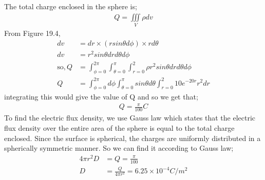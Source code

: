 \begin{exmp}
	The total charge enclosed in the sphere is;
	\begin{align*}
			Q=\iiint\limits_V\rho dv
		\end{align*}
	From Figure 19.4, 
	\begin{align*}
			dv &= dr\times(rsin\theta d\phi)\times rd\theta \\
			dv&=r^{2}sin\theta drd\theta d\phi\\
			\text{so}, Q&=\int^{2\pi}_{\phi=0}\int^{\pi}_{\theta=0}\int^{2}_{r=0} \rho r^{2}sin\theta drd\theta d\phi\\
			Q&= \int^{2\pi}_{\phi=0}d\phi\int^{\pi}_{\theta=0}sin\theta d\theta\int^{2}_{r=0}10e^{-20r}r^{2}dr
		\end{align*}
	integrating this would give the value of Q and so we get that;
	\begin{align*}
			Q=\frac{\pi}{100} C
		\end{align*}
	To find the electric flux density, we use Gauss law which states that the electric flux density over the entire area of the sphere is equal to the total charge enclosed. Since the surface is spherical, the charges are uniformly distributed in a spherically symmetric manner. So we can find it according to Gauss law;
	\begin{align*}
			4\pi r^{2}D&=Q=\frac{\pi}{100}\\
			D&=\frac{Q}{4\pi r^{2}}= 6.25\times10^{-4} C/m^{2}
		\end{align*}
\end{exmp}

